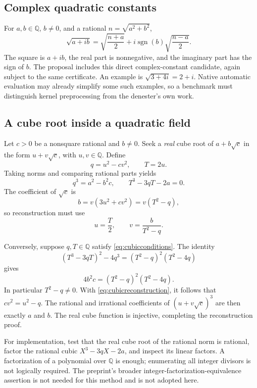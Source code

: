 \documentclass[11pt,letterpaper]{article}
\newcommand{\Q}{\mathbb Q}
\DeclareMathOperator{\sgn}{sgn}
\theoremstyle{definition}
\begin{document}
\subsection{Complex quadratic constants}

For $a,b\in\Q$, $b\ne0$, and a rational $n=\sqrt{a^2+b^2}$,
\[
 \sqrt{a+ib}=\sqrt{\frac{n+a}{2}}+
 i\sgn(b)\sqrt{\frac{n-a}{2}}.
\]
The square is $a+ib$, the real part is nonnegative, and the imaginary part has the sign of $b$. The proposal includes this direct complex-constant candidate, again subject to the same certificate. An example is $\sqrt{3+4i}=2+i$. Native automatic evaluation may already simplify some such examples, so a benchmark must distinguish kernel preprocessing from the denester's own work.

\subsection{A cube root inside a quadratic field}

Let $c>0$ be a nonsquare rational and $b\ne0$. Seek a \emph{real} cube root of $a+b\sqrt c$ in the form $u+v\sqrt c$, with $u,v\in\Q$. Define
\[
 q=u^2-cv^2,\qquad T=2u.
\]
Taking norms and comparing rational parts yields
\begin{equation}\label{eq:cubicconditions}
 q^3=a^2-b^2c,\qquad T^3-3qT-2a=0.
\end{equation}
The coefficient of $\sqrt c$ is
\[
 b=v(3u^2+cv^2)=v(T^2-q),
\]
so reconstruction must use
\begin{equation}\label{eq:cubicreconstruction}
 u=\frac T2,\qquad v=\frac{b}{T^2-q}.
\end{equation}

Conversely, suppose $q,T\in\Q$ satisfy \eqref{eq:cubicconditions}. The identity
\begin{equation}\label{eq:traceidentity}
 (T^3-3qT)^2-4q^3=(T^2-q)^2(T^2-4q)
\end{equation}
gives
\[
 4b^2c=(T^2-q)^2(T^2-4q).
\]
In particular $T^2-q\ne0$. With \eqref{eq:cubicreconstruction}, it follows that $cv^2=u^2-q$. The rational and irrational coefficients of $(u+v\sqrt c)^3$ are then exactly $a$ and $b$. The real cube function is injective, completing the reconstruction proof.

For implementation, test that the real cube root of the rational norm is rational, factor the rational cubic $X^3-3qX-2a$, and inspect its linear factors. A factorization of a polynomial over $\Q$ is enough; enumerating all integer divisors is not logically required. The preprint's broader integer-factorization-equivalence assertion is not needed for this method and is not adopted here.\cite{cavallo}
\end{document}
